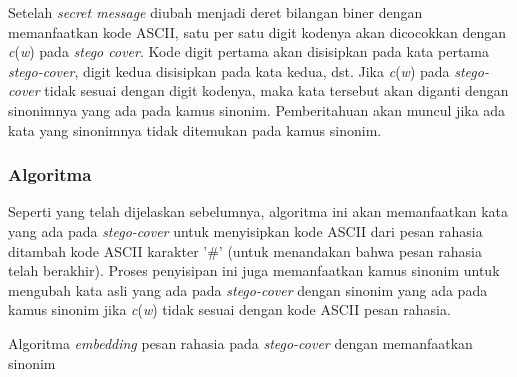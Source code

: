 Setelah \textit{secret message} diubah menjadi deret bilangan biner dengan memanfaatkan kode ASCII, satu per satu digit kodenya akan dicocokkan dengan \textit{c}(\textit{w}) pada \textit{stego cover}. Kode digit pertama akan disisipkan pada kata pertama \textit{stego-cover}, digit kedua disisipkan pada kata kedua, dst. Jika \textit{c}(\textit{w}) pada \textit{stego-cover} tidak sesuai dengan digit kodenya, maka kata tersebut akan diganti dengan sinonimnya yang ada pada kamus sinonim. Pemberitahuan akan muncul jika ada kata yang sinonimnya tidak ditemukan pada kamus sinonim.

\subsubsection{Algoritma}
Seperti yang telah dijelaskan sebelumnya, algoritma ini akan memanfaatkan kata yang ada pada \textit{stego-cover} untuk menyisipkan kode ASCII dari pesan rahasia ditambah kode ASCII karakter '\#' (untuk menandakan bahwa pesan rahasia telah berakhir). Proses penyisipan ini juga memanfaatkan kamus sinonim untuk mengubah kata asli yang ada pada \textit{stego-cover} dengan sinonim yang ada pada kamus sinonim jika \textit{c}(\textit{w}) tidak sesuai dengan kode ASCII pesan rahasia.

Algoritma \textit{embedding} pesan rahasia pada \textit{stego-cover} dengan memanfaatkan sinonim

